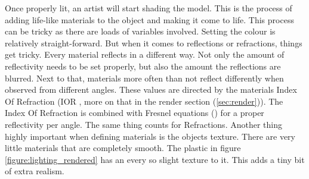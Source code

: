 Once properly lit, an artist will start shading the model. This is the process of adding life-like materials to the object and making it come to life. This process can be tricky as there are loads of variables involved. Setting the colour is relatively straight-forward. But when it comes to reflections or refractions, things get tricky. Every material reflects in a different way. Not only the amount of reflectivity needs to be set properly, but also the amount the reflections are blurred. Next to that, materials more often than not reflect differently when observed from different angles. These values are directed by the materials Index Of Refraction (IOR \cite{refractiveIndex}, more on that in the render section (\ref{sec:render})). The Index Of Refraction is combined with Fresnel equations (\cite{fresnelEquations}) for a proper reflectivity per angle. The same thing counts for Refractions.
Another thing highly important when defining materials is the objects texture. There are very little materials that are completely smooth. The plastic in figure \ref{figure:lighting_rendered} has an every so slight texture to it. This adds a tiny bit of extra realism.


